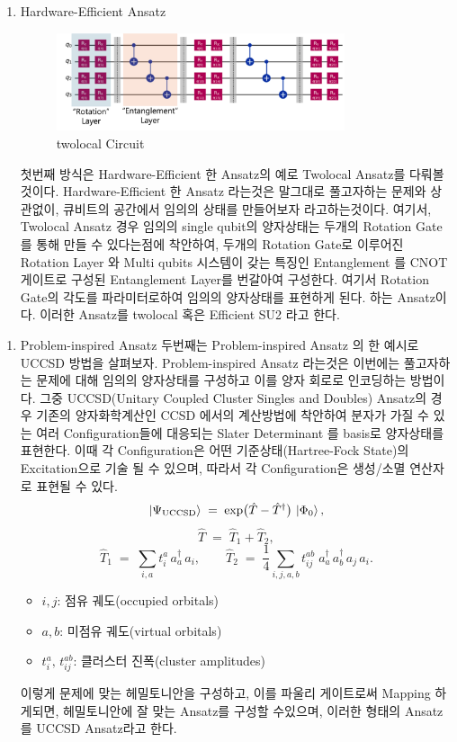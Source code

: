 \documentclass[11pt]{article}
\begin{document}
\begin{enumerate}[label=\(1\))]
\item {Hardware-Efficient Ansatz}
\begin{figure}[H]
  \centering
  \includegraphics[width=0.8\textwidth]{fig/twolocal.png}
  \caption{twolocal Circuit}
  \label{fig:example3}
\end{figure}
첫번째 방식은 Hardware-Efficient 한 Ansatz의 예로 Twolocal Ansatz를 다뤄볼것이다. 
Hardware-Efficient 한 Ansatz 라는것은 말그대로 풀고자하는 문제와 상관없이, 큐비트의 공간에서 임의의 상태를 만들어보자 라고하는것이다. 
여기서, Twolocal Ansatz 경우 임의의 single qubit의 양자상태는 두개의 Rotation Gate를 통해 만들 수 있다는점에 착안하여, 
두개의 Rotation Gate로 이루어진 Rotation Layer 와 Multi qubits 시스템이 갖는 특징인 Entanglement 를 CNOT 게이트로 구성된 Entanglement Layer를 번갈아여 구성한다. 
여기서  Rotation Gate의 각도를 파라미터로하여 임의의 양자상태를 표현하게 된다. 하는 Ansatz이다. 이러한 Ansatz를 twolocal 혹은 Efficient SU2 라고 한다. 
\end{enumerate}

\begin{enumerate}[label=\(2\))]
\item {Problem-inspired Ansatz}
두번째는 Problem-inspired Ansatz 의 한 예시로 UCCSD 방법을 살펴보자.
Problem-inspired Ansatz 라는것은 이번에는 풀고자하는 문제에 대해 임의의 양자상태를 구성하고 이를 양자 회로로 인코딩하는 방법이다. 
그중 UCCSD(Unitary Coupled Cluster Singles and Doubles) Ansatz의 경우 기존의 양자화학계산인 CCSD 에서의 계산방법에 착안하여
분자가 가질 수 있는 여러 Configuration들에 대응되는 Slater Determinant 를 basis로 양자상태를 표현한다. 
이때 각 Configuration은 어떤 기준상태(Hartree-Fock State)의 Excitation으로 기술 될 수 있으며, 따라서 각 Configuration은 생성/소멸 연산자로 표현될 수 있다. 
\[
\ket{\Psi_{\mathrm{UCCSD}}}
   \;=\;
   \exp\bigl(\hat{T} - \hat{T}^\dagger\bigr)\,\ket{\Phi_0},
\]
\[
\hat{T} \;=\; \hat{T}_1 + \hat{T}_2,
\]
\[
\hat{T}_1 \;=\; \sum_{i,a} t_i^a \,a_a^\dagger\,a_i,
\qquad
\hat{T}_2 \;=\; \frac{1}{4}\sum_{i,j,a,b} t_{ij}^{ab}\;a_a^\dagger\,a_b^\dagger\,a_j\,a_i.
\]

\begin{itemize}
  \item \(i,j\): 점유 궤도(occupied orbitals)
  \item \(a,b\): 미점유 궤도(virtual orbitals)
  \item \(t_i^a,\,t_{ij}^{ab}\): 클러스터 진폭(cluster amplitudes)
\end{itemize}
이렇게 문제에 맞는 헤밀토니안을 구성하고, 이를 파울리 게이트로써 Mapping 하게되면, 헤밀토니안에 잘 맞는 Ansatz를 구성할 수있으며, 이러한 형태의 Ansatz를 UCCSD Ansatz라고 한다. 
\end{enumerate}
\end{document}

